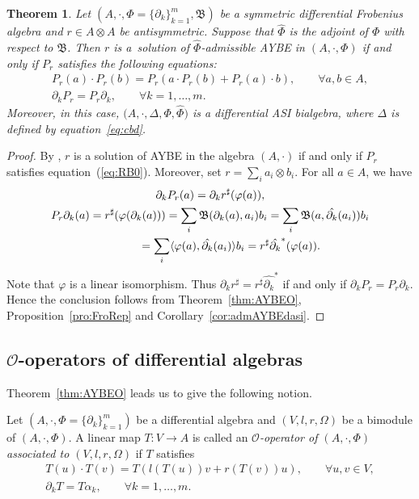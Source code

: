 \documentclass[10pt,a4paper]{amsart}
\numberwithin{equation}{section}
\newtheorem{Theorem}{Theorem}[section]
\begin{document}
\begin{Theorem}
 Let $(A, \cdot, \Phi = \{\partial_k\}_{k=1}^m, \mathfrak{B})$ be a symmetric differential Frobenius algebra and $r \in A \otimes A$ be antisymmetric.
 Suppose that $\hat{\Phi}$ is the adjoint of $\Phi$ with respect to $\mathfrak{B}$.
	Then $r$ is a~solution of $\hat{\Phi}$-admissible AYBE in $(A, \cdot, \Phi)$ if and only if
 $P_r$ satisfies the following equations:
 \begin{gather}
 P_r(a) \cdot P_r(b) = P_r(a \cdot P_r(b) + P_r(a) \cdot b), \qquad \forall a, b \in
 A,\label{eq:RB0}\\
		\partial_k P_r = P_r \partial_k,\qquad \forall k=1, \dots, m.
 \end{gather}
Moreover, in this case, $\big(A, \cdot, \Delta, \Phi, \hat{\Phi}\big)$ is
a differential ASI bialgebra, where $\Delta$ is defined by
equation~\eqref{eq:cbd}.
\end{Theorem}
\begin{proof}
 By \cite[Corollary~3.17]{Bai2013O},
 $r$ is a solution of AYBE in the algebra $(A, \cdot)$ if and only if $P_r$ satisfies equation~(\ref{eq:RB0}).
 Moreover, set $r = \sum_i a_i\otimes b_i$.
 For all $a \in A$, we have
 \begin{gather*}
 \partial_k P_r(a) = \partial_k r^\sharp (\varphi(a)), \\
 P_r \partial_k(a) = r^\sharp(\varphi(\partial_k(a))) = \sum_i \mathfrak{B}(\partial_k(a),a_i) b_i = \sum_i \mathfrak{B}(a, \hat{\partial_k}(a_i)) b_i \\
 \hphantom{P_r \partial_k(a)}{}
 = \sum_i \langle \varphi(a), \hat{\partial_k}(a_i) \rangle b_i = r^\sharp \hat{\partial_k}^*(\varphi(a)).
 \end{gather*}
 Note that $\varphi$ is a linear isomorphism. Thus $\partial_k r^\sharp = r^\sharp \hat{\partial_k}^*$ if and only if $\partial_k P_r = P_r \partial_k$.
 Hence the conclusion follows from Theorem~\ref{thm:AYBEO}, Proposition~\ref{pro:FroRep} and Corollary~\ref{cor:admAYBEdasi}.
\end{proof}

\subsection[O-operators of differential algebras]{$\boldsymbol{\mathcal{O}}$-operators of differential algebras}\label{subsec:o_operator}

Theorem~\ref{thm:AYBEO} leads us to give the following notion.
\begin{Definition}
	Let $(A, \cdot, \Phi = \{\partial_k\}_{k=1}^m)$ be a differential algebra and $(V, l, r, \Omega)$ be a bimodule of $(A, \cdot, \Phi)$.
	A linear map $T\colon V \to A$ is called an \textit{$\mathcal{O}$-operator of $(A, \cdot, \Phi)$ associated to $(V, l, r, \Omega)$} if $T$ satisfies
	\begin{gather}
		T(u) \cdot T(v) = T( l(T(u))v + r(T(v)) u ), \qquad \forall u, v \in V, \label{eq:oop1} \\
		\partial_k T = T \alpha_k, \qquad \forall k=1, \dots, m. \label{eq:oop2}
	\end{gather}
\end{Definition}
\end{document}
